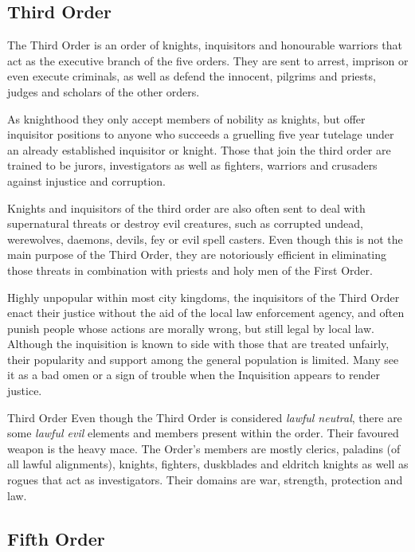 \subsection{Third Order}
\label{sec:Third Order}

The Third Order is an order of knights, inquisitors and honourable warriors
that act as the executive branch of the five orders. They are sent to arrest,
imprison or even execute criminals, as well as defend the innocent, pilgrims
and priests, judges and scholars of the other orders.

As knighthood they only accept members of nobility as knights, but offer
inquisitor positions to anyone who succeeds a gruelling five year tutelage
under an already established inquisitor or knight. Those that join the third
order are trained to be jurors, investigators as well as fighters, warriors and
crusaders against injustice and corruption.

Knights and inquisitors of the third order are also often sent to deal with
supernatural threats or destroy evil creatures, such as corrupted undead,
werewolves, daemons, devils, fey or evil spell casters. Even though this is
not the main purpose of the Third Order, they are notoriously efficient in
eliminating those threats in combination with priests and holy men of the
First Order.

Highly unpopular within most city kingdoms, the inquisitors of the Third Order
enact their justice without the aid of the local law enforcement agency, and
often punish people whose actions are morally wrong, but still legal by local
law. Although the inquisition is known to side with those that are treated
unfairly, their popularity and support among the general population is
limited. Many see it as a bad omen or a sign of trouble when the Inquisition
appears to render justice.

\begin{35e}{Third Order}
  Even though the Third Order is considered \emph{lawful neutral}, there are
  some \emph{lawful evil} elements and members present within the order. Their
  favoured weapon is the heavy mace. The Order's members are mostly clerics,
  paladins (of all lawful alignments), knights, fighters, duskblades and
  eldritch knights as well as rogues that act as investigators. Their domains
  are war, strength, protection and law.
\end{35e}

\subsection{Fifth Order}
\label{sec:Fifth Order}

